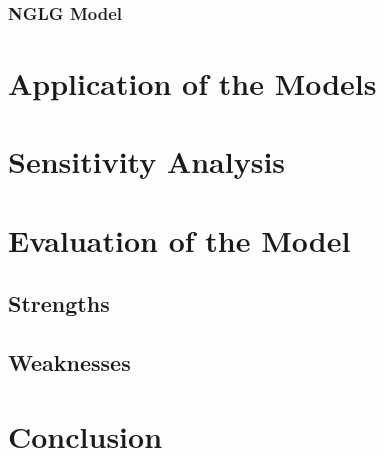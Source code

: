 \documentclass{HZNUMCM}
\begin{document}
      \subsubsection{NGLG Model}
        
  \section{Application of the Models}

  \section{Sensitivity Analysis}

  \section{Evaluation of the Model}
    \subsection{Strengths}
    \subsection{Weaknesses}

  \section{Conclusion}


\end{document}
